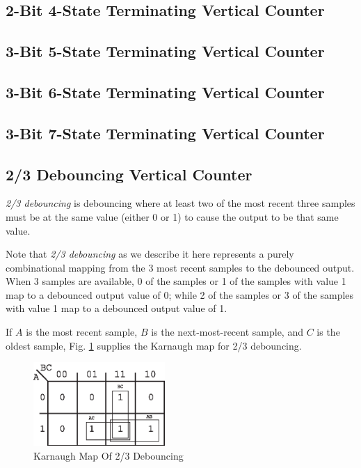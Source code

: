 \subsection{2-Bit 4-State Terminating Vertical Counter}
\label{cbal0:svct0:stbf8}


\subsection{3-Bit 5-State Terminating Vertical Counter}
\label{cbal0:svct0:stbf9}


\subsection{3-Bit 6-State Terminating Vertical Counter}
\label{cbal0:svct0:stbg0}


\subsection{3-Bit 7-State Terminating Vertical Counter}
\label{cbal0:svct0:stbg1}


\subsection{2/3 Debouncing Vertical Counter}
\label{cbal0:svct0:sttd0}

\emph{2/3 debouncing} 
is debouncing where at least two of the most recent
three samples must be at the same value (either 0 or 1) to cause the output
to be that same value.

Note that \emph{2/3 debouncing} as we describe it here represents a
purely combinational mapping from the 3 most recent samples to
the debounced output.  When 3 samples are available, 0 of the
samples or 1 of the samples with value 1 map to a debounced
output value of 0; while 2 of the samples or 3 of the samples
with value 1 map to a debounced output value of 1.

If $A$ is the most recent sample, $B$ is the next-most-recent sample, and 
$C$ is the oldest sample, Fig. \ref{fig:cbal0:svct0:sttd0:01} 
supplies the Karnaugh map for 2/3
debouncing.

\begin{figure}
\centering
\includegraphics[height=1.25in]{c_bal0/kmap23db.eps}
\caption{Karnaugh Map Of 2/3 Debouncing}
\label{fig:cbal0:svct0:sttd0:01}
\end{figure}

